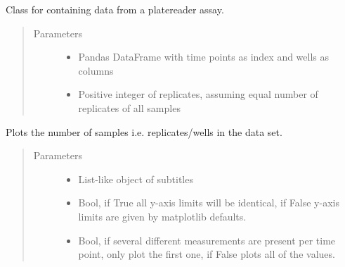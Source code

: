 \documentclass[letterpaper,10pt,english]{sphinxmanual}
\begin{document}
\begin{fulllineitems}
\label{\detokenize{platelib:platelib.plateread.Plate_data}}
Class for containing data from a platereader assay.
\begin{quote}\begin{description}
\item[{Parameters}] \leavevmode\begin{itemize}
\item {} 
 \textendash{} Pandas DataFrame with time points as index and wells as columns

\item {} 
 \textendash{} Positive integer of replicates, assuming equal number of replicates of all samples

\end{itemize}

\end{description}\end{quote}

\begin{fulllineitems}
\label{\detokenize{platelib:platelib.plateread.Plate_data.plot}}
Plots the number of samples i.e. replicates/wells in the data set.
\begin{quote}\begin{description}
\item[{Parameters}] \leavevmode\begin{itemize}
\item {} 
 \textendash{} List-like object of subtitles

\item {} 
 \textendash{} Bool, if True all y-axis limits will be identical, if False y-axis limits are given by matplotlib defaults.

\item {} 
 \textendash{} Bool, if several different measurements are present per time point, only plot the first one, if False plots all of the values.


\end{itemize}
\end{description}
\end{quote}
\end{fulllineitems}
\end{fulllineitems}
\end{document}
